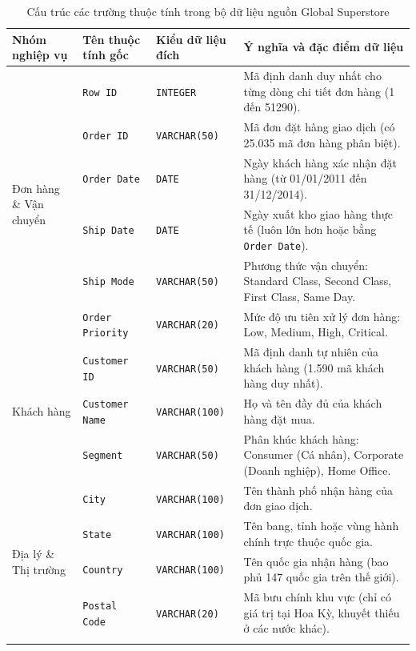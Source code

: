 \begin{table}[H]
\centering
\caption{Cấu trúc các trường thuộc tính trong bộ dữ liệu nguồn Global Superstore}
\label{tab:raw_schema}
\footnotesize
\renewcommand{\arraystretch}{1.22}
\begin{tabularx}{\textwidth}{|l|l|l|X|}
\hline
\textbf{Nhóm nghiệp vụ} & \textbf{Tên thuộc tính gốc} & \textbf{Kiểu dữ liệu đích} & \textbf{Ý nghĩa và đặc điểm dữ liệu} \\
\hline
\multirow{6}{*}{Đơn hàng \& Vận chuyển} 
 & \texttt{Row ID} & \texttt{INTEGER} & Mã định danh duy nhất cho từng dòng chi tiết đơn hàng (1 đến 51290). \\ \cline{2-4}
 & \texttt{Order ID} & \texttt{VARCHAR(50)} & Mã đơn đặt hàng giao dịch (có 25.035 mã đơn hàng phân biệt). \\ \cline{2-4}
 & \texttt{Order Date} & \texttt{DATE} & Ngày khách hàng xác nhận đặt hàng (từ 01/01/2011 đến 31/12/2014). \\ \cline{2-4}
 & \texttt{Ship Date} & \texttt{DATE} & Ngày xuất kho giao hàng thực tế (luôn lớn hơn hoặc bằng \texttt{Order Date}). \\ \cline{2-4}
 & \texttt{Ship Mode} & \texttt{VARCHAR(50)} & Phương thức vận chuyển: Standard Class, Second Class, First Class, Same Day. \\ \cline{2-4}
 & \texttt{Order Priority} & \texttt{VARCHAR(20)} & Mức độ ưu tiên xử lý đơn hàng: Low, Medium, High, Critical. \\
\hline
\multirow{3}{*}{Khách hàng} 
 & \texttt{Customer ID} & \texttt{VARCHAR(50)} & Mã định danh tự nhiên của khách hàng (1.590 mã khách hàng duy nhất). \\ \cline{2-4}
 & \texttt{Customer Name} & \texttt{VARCHAR(100)} & Họ và tên đầy đủ của khách hàng đặt mua. \\ \cline{2-4}
 & \texttt{Segment} & \texttt{VARCHAR(50)} & Phân khúc khách hàng: Consumer (Cá nhân), Corporate (Doanh nghiệp), Home Office. \\
\hline
\multirow{6}{*}{Địa lý \& Thị trường} 
 & \texttt{City} & \texttt{VARCHAR(100)} & Tên thành phố nhận hàng của đơn giao dịch. \\ \cline{2-4}
 & \texttt{State} & \texttt{VARCHAR(100)} & Tên bang, tỉnh hoặc vùng hành chính trực thuộc quốc gia. \\ \cline{2-4}
 & \texttt{Country} & \texttt{VARCHAR(100)} & Tên quốc gia nhận hàng (bao phủ 147 quốc gia trên thế giới). \\ \cline{2-4}
 & \texttt{Postal Code} & \texttt{VARCHAR(20)} & Mã bưu chính khu vực (chỉ có giá trị tại Hoa Kỳ, khuyết thiếu ở các nước khác). \\ \cline{2-4}

\end{tabularx}
\end{table}
